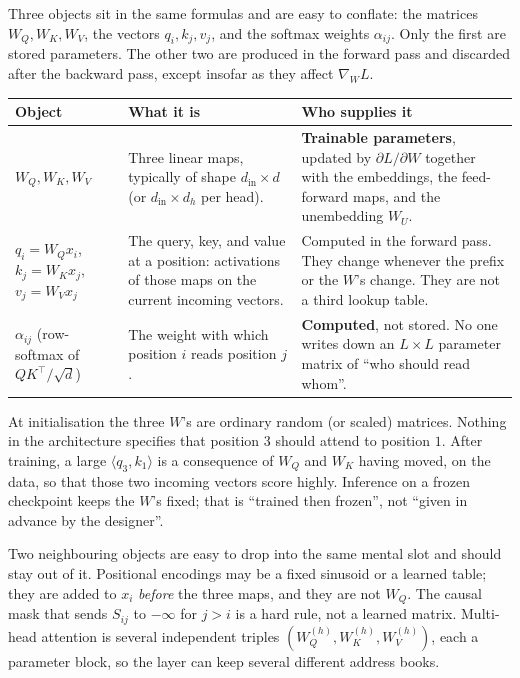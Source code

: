 \documentclass[11pt,a4paper]{article}
\theoremstyle{definition}
\begin{document}
\begin{remark}\label{rem:spr2025-nlp-wqkv-params}
Three objects sit in the same formulas and are easy to conflate: the matrices \(W_Q,W_K,W_V\), the vectors \(q_i,k_j,v_j\), and the softmax weights \(\alpha_{ij}\). Only the first are stored parameters. The other two are produced in the forward pass and discarded after the backward pass, except insofar as they affect \(\nabla_{W}L\).

{\small
\setlength{\tabcolsep}{3.6pt}
\renewcommand{\arraystretch}{1.18}
\begin{center}
\begin{tabularx}{\linewidth}{%
  |>{\raggedright\arraybackslash}p{3.15cm}%
  |>{\raggedright\arraybackslash}X%
  |>{\raggedright\arraybackslash}X%
  |}
\hline
\textbf{Object} & \textbf{What it is} & \textbf{Who supplies it} \\
\hline
\(W_Q,W_K,W_V\) &
Three linear maps, typically of shape \(d_{\mathrm{in}}\times d\) (or \(d_{\mathrm{in}}\times d_h\) per head).
&
\textbf{Trainable parameters}, updated by \(\partial L/\partial W\) together with the embeddings, the feed-forward maps, and the unembedding \(W_U\). \\
\hline
\(q_i=W_Q x_i\), \(k_j=W_K x_j\), \(v_j=W_V x_j\) &
The query, key, and value at a position: activations of those maps on the current incoming vectors.
&
Computed in the forward pass. They change whenever the prefix or the \(W\)'s change. They are not a third lookup table. \\
\hline
\(\alpha_{ij}\) (row-softmax of \(QK^\top/\sqrt{d}\)) &
The weight with which position \(i\) reads position \(j\).
&
\textbf{Computed}, not stored. No one writes down an \(L\times L\) parameter matrix of ``who should read whom''. \\
\hline
\end{tabularx}
\end{center}
}

At initialisation the three \(W\)'s are ordinary random (or scaled) matrices. Nothing in the architecture specifies that position \(3\) should attend to position \(1\). After training, a large \(\langle q_3,k_1\rangle\) is a consequence of \(W_Q\) and \(W_K\) having moved, on the data, so that those two incoming vectors score highly. Inference on a frozen checkpoint keeps the \(W\)'s fixed; that is ``trained then frozen'', not ``given in advance by the designer''.

Two neighbouring objects are easy to drop into the same mental slot and should stay out of it. Positional encodings may be a fixed sinusoid or a learned table; they are added to \(x_i\) \emph{before} the three maps, and they are not \(W_Q\). The causal mask that sends \(S_{ij}\) to \(-\infty\) for \(j>i\) is a hard rule, not a learned matrix. Multi-head attention is several independent triples \((W_Q^{(h)},W_K^{(h)},W_V^{(h)})\), each a parameter block, so the layer can keep several different address books.


\end{remark}
\end{document}
